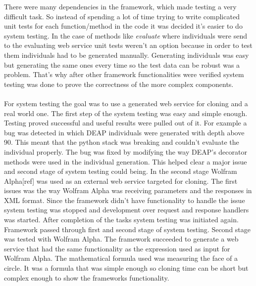There were many dependencies in the framework, which made testing a very difficult task. So instead of spending
a lot of time trying to write complicated unit tests for each function/method in the code it was
decided it's easier to do system testing. In the case of methods like \textit{evaluate} where individuals were send to the evaluating
web service unit tests weren't an option because in order to test them individuals had to be generated manually. Generating
individuals was easy but generating the same ones every time so the test data can be robust was a problem. That's why after
other framework functionalities were verified system testing was done to prove the correctness of the more complex components.
\paragraph{}
For system testing the goal was to use a generated web service for cloning and a real world one. The first step of the system
testing was easy and simple enough. Testing proved successful and useful results were pulled out of it. For example a bug was
detected in which DEAP individuals were generated with depth above 90. This meant that the python stack was breaking and couldn't
evaluate the individual properly. The bug was fixed by modifying the way DEAP's decorator methods were used in the individual
generation. This helped clear a major issue and second stage of system testing could being. In the second stage Wolfram Alpha[ref] 
was used as an external web service targeted for cloning. The first issues was the way Wolfram Alpha was receiving parameters and
the responses in XML format. Since the framework didn't have functionality to handle the issue system testing was stopped and development
over request and response handlers was started. After completion of the tasks system testing was initiated again. Framework passed through
first and second stage of system testing. Second stage was tested with Wolfram Alpha. The framework succeeded to generate a web service that had the same functionality
as the expression used as input for Wolfram Alpha. The mathematical formula used was measuring the face of a circle. It was a formula
that was simple enough so cloning time can be short but complex enough to show the frameworks functionality.
